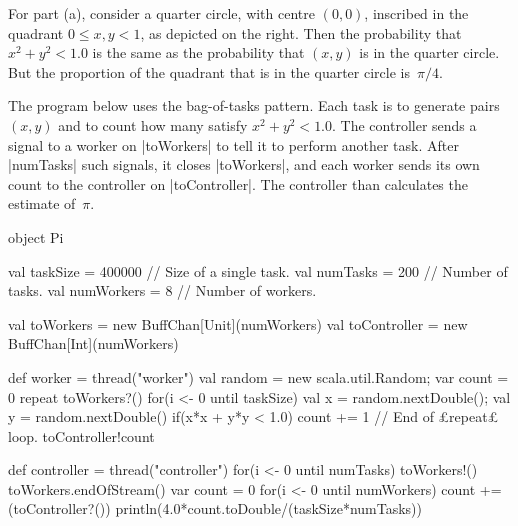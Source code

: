 \begin{answerS}
\begin{myminipage}{102mm}
For part (a), consider a quarter circle, with centre $(0,0)$, inscribed in the
quadrant $0 \le x,y < 1$, as depicted on the right.  Then the probability that
$x^2+y^2 < 1.0$ is the same as the probability that $(x,y)$ is in the quarter
circle.  But the proportion of the quadrant that is in the quarter circle
is~$\pi/4$.
\end{myminipage}
%
\hfill
%
\begin{myminipage}{34mm}
\def\dd{-0.15}
\end{myminipage}

\smallskip

The program below uses the bag-of-tasks pattern.  Each task is to generate
 pairs $(x,y)$ and to count how many satisfy $x^2+y^2 < 1.0$.
The controller sends a signal to a worker on |toWorkers| to tell it to perform
another task.  After |numTasks| such signals, it closes |toWorkers|, and each
worker sends its own count to the controller on |toController|.  The
controller than calculates the estimate of~$\pi$.   
%
\begin{scala}
object Pi{
  val taskSize = 400000 // Size of a single task.
  val numTasks = 200    // Number of tasks.
  val numWorkers = 8    // Number of workers.

  val toWorkers = new BuffChan[Unit](numWorkers)
  val toController = new BuffChan[Int](numWorkers)

  def worker = thread("worker"){
    val random = new scala.util.Random; var count = 0
    repeat{
      toWorkers?()
      for(i <- 0 until taskSize){
	val x = random.nextDouble(); val y = random.nextDouble()
	if(x*x + y*y < 1.0) count += 1
      }
    } // End of £repeat£ loop.
    toController!count
  }

  def controller = thread("controller"){
    for(i <- 0 until numTasks) toWorkers!()
    toWorkers.endOfStream()
    var count = 0
    for(i <- 0 until numWorkers) count += (toController?())
    println(4.0*count.toDouble/(taskSize*numTasks))
  }

}
\end{scala}
\end{answerS}
